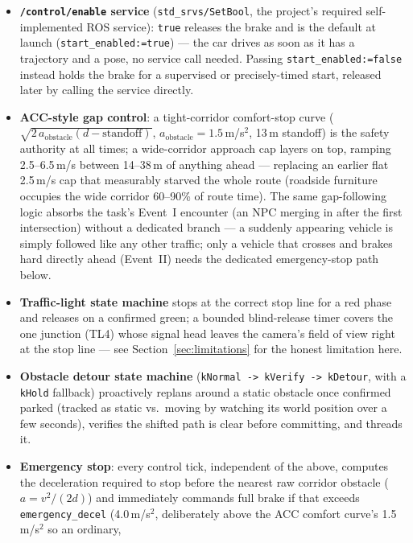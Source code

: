 \documentclass[10pt,twocolumn]{article}
\begin{document}
\begin{itemize}[leftmargin=*]
\item \textbf{\texttt{/control/enable} service} (\texttt{std\_srvs/SetBool},
  the project's required self-implemented ROS service): \texttt{true}
  releases the brake and is the default at launch
  (\texttt{start\_enabled:=true}) --- the car drives as soon as it has a
  trajectory and a pose, no service call needed. Passing
  \texttt{start\_enabled:=false} instead holds the brake for a
  supervised or precisely-timed start, released later by calling the
  service directly.
\item \textbf{ACC-style gap control}: a tight-corridor comfort-stop curve
  ($\sqrt{2\,a_{\text{obstacle}}(d-\text{standoff})}$,
  $a_{\text{obstacle}}=1.5$\,m/s$^2$, 13\,m standoff) is the safety
  authority at all times; a wide-corridor approach cap layers on top,
  ramping 2.5--6.5\,m/s between 14--38\,m of anything ahead --- replacing
  an earlier flat 2.5\,m/s cap that measurably starved the whole route
  (roadside furniture occupies the wide corridor 60--90\% of route
  time). The same gap-following logic absorbs the task's Event~I
  encounter (an NPC merging in after the first intersection) without a
  dedicated branch --- a suddenly appearing vehicle is simply followed
  like any other traffic; only a vehicle that crosses and brakes hard
  directly ahead (Event~II) needs the dedicated emergency-stop path
  below.
\item \textbf{Traffic-light state machine} stops at the correct stop line
  for a red phase and releases on a confirmed green; a bounded
  blind-release timer covers the one junction (TL4) whose signal head
  leaves the camera's field of view right at the stop line --- see
  Section~\ref{sec:limitations} for the honest limitation here.
\item \textbf{Obstacle detour state machine}
  (\texttt{kNormal -> kVerify -> kDetour}, with a \texttt{kHold} fallback)
  proactively replans around a static obstacle once confirmed parked
  (tracked as static vs.\ moving by watching its world position over a
  few seconds), verifies the shifted path is clear before committing, and
  threads it.
\item \textbf{Emergency stop}: every control tick, independent of the
  above, computes the deceleration required to stop before the nearest
  raw corridor obstacle ($a = v^2 / (2d)$) and immediately commands full
  brake if that exceeds \texttt{emergency\_decel} (4.0\,m/s$^2$,
  deliberately above the ACC comfort curve's 1.5\,m/s$^2$ so an ordinary,

\end{itemize}
\end{document}

